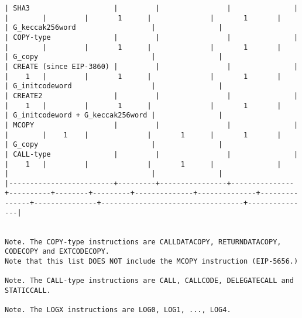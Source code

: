 \documentclass[varwidth=\maxdimen,margin=0.5cm,multi={verbatim}]{standalone}
\begin{document}
\begin{verbatim}
| SHA3                    |         |                |               |          |        |         |       1      |              |       1       |               | G_keccak256word                  |               |
| COPY-type               |         |                |               |          |        |         |       1      |              |       1       |               | G_copy                           |               |
| CREATE (since EIP-3860) |         |                |               |          |    1   |         |       1      |              |       1       |               | G_initcodeword                   |               |
| CREATE2                 |         |                |               |          |    1   |         |       1      |              |       1       |               | G_initcodeword + G_keccak256word |               |
| MCOPY                   |         |                |               |          |        |    1    |              |       1      |       1       |               | G_copy                           |               |
| CALL-type               |         |                |               |          |    1   |         |              |       1      |               |               |                                  |               |
|-------------------------+---------+----------------+---------------+----------+--------+---------+--------------+--------------+---------------+---------------+----------------------------------+---------------|


Note. The COPY-type instructions are CALLDATACOPY, RETURNDATACOPY, CODECOPY and EXTCODECOPY.
Note that this list DOES NOT include the MCOPY instruction (EIP-5656.)

Note. The CALL-type instructions are CALL, CALLCODE, DELEGATECALL and STATICCALL.

Note. The LOGX instructions are LOG0, LOG1, ..., LOG4.

\end{verbatim}
\end{document}
